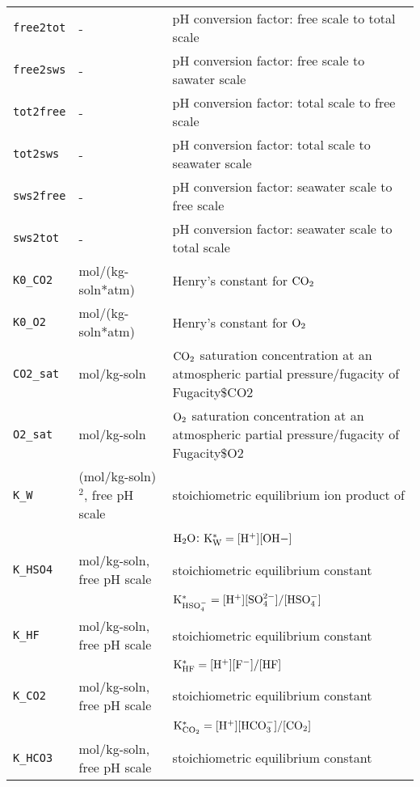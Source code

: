 \documentclass[article,nojss]{jss}
\begin{document}
\begin{footnotesize}
\begin{longtable}{l|l|p{7cm}}
\texttt{free2tot}    & -                            & pH conversion factor: free scale to total scale\\
\texttt{free2sws}    & -                            & pH conversion factor: free scale to sawater scale\\
\texttt{tot2free}    & -                            & pH conversion factor: total scale to free scale\\ 
\texttt{tot2sws}     & -                            & pH conversion factor: total scale to seawater scale\\ 
\texttt{sws2free}    & -                            & pH conversion factor: seawater scale to  free scale\\ 
\texttt{sws2tot}     & -                            & pH conversion factor: seawater scale to total scale\\ 
\texttt{K0\_CO2}     & mol/(kg-soln*atm)            & Henry's constant for $\rm CO_2$\\ 
\texttt{K0\_O2}      & mol/(kg-soln*atm)            & Henry's constant for $\rm O_2$\\ 
\texttt{CO2\_sat}    & mol/kg-soln                  & $\rm CO_2$ saturation concentration at an atmospheric partial pressure/fugacity of Fugacity\$CO2\\
\texttt{O2\_sat}     & mol/kg-soln                  & $\rm O_2$ saturation concentration at an atmospheric partial pressure/fugacity of Fugacity\$O2\\
\texttt{K\_W}        &(mol/kg-soln)$^2$, free pH scale & stoichiometric equilibrium ion product of \\
            &                              & $\rm H_2O$: $\rm K^*_W = [H^+][OH-]$\\
\texttt{K\_HSO4}     &mol/kg-soln,       free pH scale & stoichiometric equilibrium constant \\
            &                              & $\rm K^*_{HSO_4^-} = [H^+][SO_4^{2-}] / [HSO_4^-]$\\
\texttt{K\_HF}       &mol/kg-soln,       free pH scale & stoichiometric equilibrium constant\\
            &                                 & $\rm K^*_{HF} = [H^+][F^{-}] / [HF]$\\
\texttt{K\_CO2}      &mol/kg-soln,       free pH scale & stoichiometric equilibrium constant\\
            &                                 & $\rm K^*_{CO_2} = [H^+][HCO_3^{-}] / [CO_2]$\\
\texttt{K\_HCO3}     &mol/kg-soln,       free pH scale & stoichiometric equilibrium constant \\

\end{longtable}
\end{footnotesize}
\end{document}

